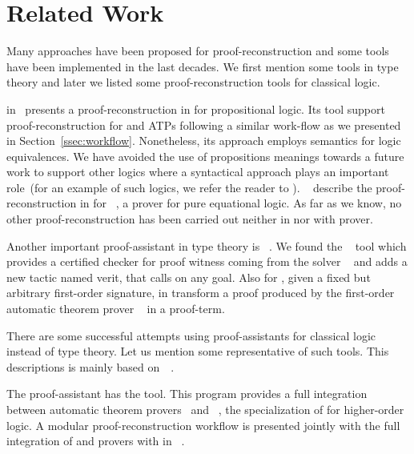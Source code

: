 \documentclass[../main.tex]{subfiles}
\begin{document}

\section{Related Work}
\label{sec:related-work}

Many approaches have been proposed for proof-reconstruction and some tools have
been implemented in the last decades. We first mention some tools in type
theory and later we listed some proof-reconstruction tools for classical logic.

\citeauthor{Kanso2012} in~\cite{Kanso2012,kanso2016light} presents a
proof-reconstruction in \Agda for propositional logic. Its tool support
proof-reconstruction for  and  ATPs following a similar work-flow as we presented in Section~\ref{ssec:workflow}.
Nonetheless, its approach
employs semantics for logic equivalences. We have avoided the use of
propositions meanings towards a future work to support other logics where a
syntactical approach plays an important role~(for an example of such logics, we
refer the reader to \cite{Agudelo-Agudelo2017}).
\citeauthor{foster2011integrating}~\cite{foster2011integrating} describe  the
proof-reconstruction in \Agda for ~\cite{hillenbrand1997}, a
prover for pure equational logic. As far as we know, no other
proof-reconstruction has been carried out neither in \Agda nor with \Metis prover.

Another important proof-assistant in type theory is ~\cite{coqteam}.
We found the ~\cite{armand2011,Ekici2017} tool which provides a
certified checker for proof witness coming from the \SMT solver
~\cite{bouton2009} and adds a new tactic named verit, that calls
 on any  goal. Also for , given a fixed but
arbitrary first-order signature, \citeauthor{Bezem2002} in \cite{Bezem2002}
transform a proof produced by the first-order automatic theorem prover
~\cite{deNivelle2003} in a  proof-term.

There are some successful attempts using proof-assistants for classical logic
instead of type theory.
Let us mention some representative of such tools. This descriptions is
mainly based on~\citeauthor{Sicard-Ramirez2016}~\cite{Sicard-Ramirez2016}.

The  proof-assistant has the  tool.
This program provides a full integration between
automatic theorem provers~\cite{blanchette2013extending,Fleury2014,bohme2010} and
~\cite{nipkow2002isabelle}, the specialization of
 for higher-order logic.
A modular proof-reconstruction workflow is presented jointly with
the full integration of  and  provers with
 in \citeauthor{Een2004}~\cite{Een2004}.
\end{document}
